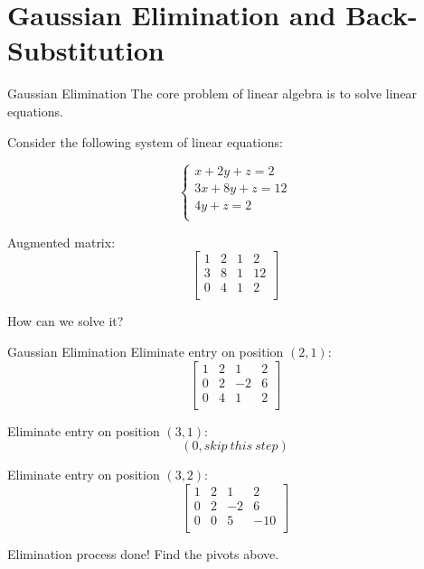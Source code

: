 \documentclass{beamer}
\begin{document}
\section{Gaussian Elimination and Back-Substitution}
\begin{frame}{Gaussian Elimination}
The core problem of linear algebra is to solve linear equations.

Consider the following system of linear equations:

\begin{equation*}
    \begin{cases}
        x+2y+z=2\\
        3x+8y+z=12\\
        4y+z=2\\
    \end{cases}
\end{equation*}

Augmented matrix:
\begin{equation*}
    \left[ \begin{matrix}
        1&		2&		1&		2\\
        3&		8&		1&		12\\
        0&		4&		1&		2\\
    \end{matrix} \right]
\end{equation*}

How can we solve it?
\end{frame}

\begin{frame}{Gaussian Elimination}
Eliminate entry on position $(2,1)$:
\begin{equation*}
    \left[ \begin{matrix}
        1&		2&		1&		2\\
        0&		2&		-2&		6\\
        0&		4&		1&		2\\
    \end{matrix} \right]
\end{equation*}

Eliminate entry on position $(3,1)$:
\begin{equation*}
    (0, skip \: this \: step)
\end{equation*}

Eliminate entry on position $(3,2)$:
\begin{equation*}
    \left[ \begin{matrix}
        1&		2&		1&		2\\
        0&		2&		-2&		6\\
        0&		0&		5&		-10\\
    \end{matrix} \right]
\end{equation*}

Elimination process done! Find the pivots above.
\end{frame}
\end{document}
